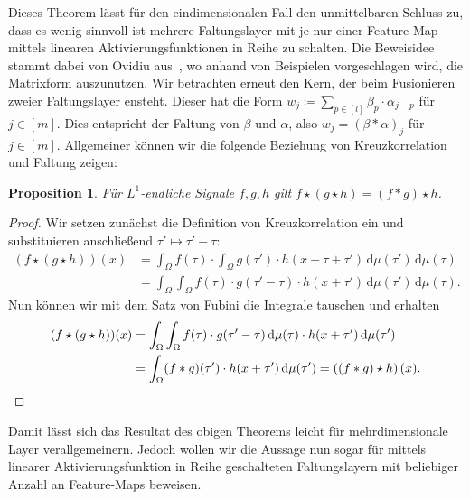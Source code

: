\documentclass[paper=a4, 	%
		fontsize=11pt, 		%
		abstracton, 	%
		headsepline, 	%
		notitlepage	%
		]{scrartcl}
\newtheorem{proposition}[theorem]{Proposition}
\theoremstyle{definition}
\newcommand{\diff}{\,\textrm{d}}
\newcommand{\fNat}[1]{[ #1 ]}
\begin{document}
Dieses Theorem lässt für den eindimensionalen Fall den unmittelbaren Schluss zu, dass es wenig sinnvoll ist mehrere Faltungslayer mit je nur einer Feature-Map mittels linearen Aktivierungsfunktionen in Reihe zu schalten.
Die Beweisidee stammt dabei von Ovidiu aus~\cite{Calin2020}, wo anhand von Beispielen vorgeschlagen wird, die Matrixform auszunutzen.
Wir betrachten erneut den Kern, der beim Fusionieren zweier Faltungslayer ensteht.
Dieser hat die Form $w_j \coloneqq \sum_{p\in\fNat{l}} \beta_p \cdot \alpha_{j-p}$ für $j\in\fNat{m}$.
Dies entspricht der Faltung von $\beta$ und $\alpha$, also $w_j = (\beta * \alpha)_j$ für $j\in\fNat{m}$.
Allgemeiner können wir die folgende Beziehung von Kreuzkorrelation und Faltung zeigen:
\begin{proposition}
    Für $L^1$-endliche Signale $f,g,h$ gilt $f\star (g \star h) = (f*g)\star h$.
\end{proposition}
\begin{proof}
    Wir setzen zunächst die Definition von Kreuzkorrelation ein und substituieren anschließend $\tau' \mapsto \tau' - \tau$:
    \begin{align*}
        (f\star (g\star h))(x)
        &= \int_\Omega f(\tau) \cdot \int_\Omega g(\tau') \cdot h(x+\tau+\tau')\diff\mu(\tau') \diff \mu(\tau) \\
        &= \int_\Omega \int_\Omega f(\tau) \cdot g(\tau' - \tau)\cdot h(x+\tau')\diff\mu(\tau') \diff \mu(\tau).
    \end{align*}
    Nun können wir mit dem Satz von Fubini die Integrale tauschen und erhalten
    \begin{align*}
        (f\star (g\star h))(x)&= \int_\Omega\int_\Omega f(\tau) \cdot g(\tau'-\tau) \diff\mu(\tau) \cdot h(x+\tau')\diff\mu(\tau') \\
        &= \int_\Omega  (f * g)(\tau')\cdot h(x+\tau') \diff \mu(\tau')
        = \left( (f * g) \star h \right)(x).\qedhere
    \end{align*}
\end{proof}

Damit lässt sich das Resultat des obigen Theorems leicht für mehrdimensionale Layer verallgemeinern.
Jedoch wollen wir die Aussage nun sogar für mittels linearer Aktivierungsfunktion in Reihe geschalteten Faltungslayern mit beliebiger Anzahl an Feature-Maps beweisen.
\end{document}
